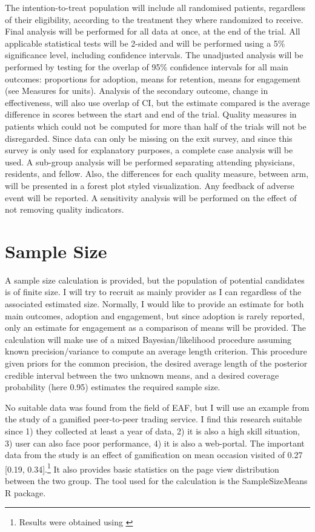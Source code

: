 The intention-to-treat population will include all randomised patients, regardless of their eligibility, according to the treatment they where randomized to receive. Final analysis will be performed for all data at once, at the end of the trial. All applicable statistical tests will be 2-sided and will be performed using a 5\% significance level, including confidence intervals. The unadjusted analysis will be performed by testing for the overlap of 95\% confidence intervals for all main outcomes: proportions for adoption, means for retention, means for engagement (see Measures for units). Analysis of the secondary outcome, change in effectiveness, will also use overlap of CI, but the estimate compared is the average difference in scores between the start and end of the trial. Quality measures in patients which could not be computed for more than half of the trials will not be disregarded. Since data can only be missing on the exit survey, and since this survey is only used for explanatory purposes, a complete case analysis will be used. A sub-group analysis will be performed separating attending physicians, residents, and fellow. Also, the differences for each quality measure, between arm, will be presented in a forest plot styled visualization. Any feedback of adverse event will be reported. A sensitivity analysis will be performed on the effect of not removing quality indicators.

\section{Sample Size}
A sample size calculation is provided, but the population of potential candidates is of finite size. I will try to recruit as mainly provider as I can regardless of the associated estimated size. Normally, I would like to provide an estimate for both main outcomes, adoption and engagement, but since adoption is rarely reported, only an estimate for engagement as a comparison of means will be provided. The calculation will make use of a mixed Bayesian/likelihood procedure assuming known precision/variance to compute an average length criterion. This procedure given priors for the common precision, the desired average length of the posterior credible interval between the two unknown means, and a desired coverage probability (here 0.95) estimates the required sample size.

No suitable data was found from the field of \gls{EAF}, but I will use an example from the study of a gamified peer-to-peer trading service. I find this research suitable since 1) they collected at least a year of data, 2) it is also a high skill situation, 3) user can also face poor performance, 4) it is also a web-portal.\cite{hamari2017badges} The important data from the study is an effect of gamification on mean occasion visited of 0.27 [0.19, 0.34].\footnote{Results were obtained using \cite{looyestyn2017does}} It also provides basic statistics on the page view distribution between the two group. The tool used for the calculation is the SampleSizeMeans R package.\cite{joseph1997bayesian}

